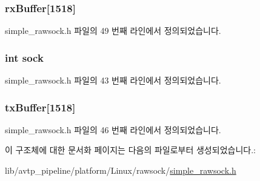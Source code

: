 \subsubsection[{\texorpdfstring{rx\+Buffer}{rxBuffer}}]{ rx\+Buffer\mbox{[}1518\mbox{]}}\hypertarget{structsimple__rawsock__t_a60a36f98faf9efc0f3447c6014c822ce}{}\label{structsimple__rawsock__t_a60a36f98faf9efc0f3447c6014c822ce}


simple\+\_\+rawsock.\+h 파일의 49 번째 라인에서 정의되었습니다.

\subsubsection[{\texorpdfstring{sock}{sock}}]{\setlength{\rightskip}{0pt plus 5cm}int sock}\hypertarget{structsimple__rawsock__t_a5903d0b282fc5eae503de618f896b5e1}{}\label{structsimple__rawsock__t_a5903d0b282fc5eae503de618f896b5e1}


simple\+\_\+rawsock.\+h 파일의 43 번째 라인에서 정의되었습니다.

\subsubsection[{\texorpdfstring{tx\+Buffer}{txBuffer}}]{ tx\+Buffer\mbox{[}1518\mbox{]}}\hypertarget{structsimple__rawsock__t_a7661fa3516bae1bdfe2000e2dea164ae}{}\label{structsimple__rawsock__t_a7661fa3516bae1bdfe2000e2dea164ae}


simple\+\_\+rawsock.\+h 파일의 46 번째 라인에서 정의되었습니다.



이 구조체에 대한 문서화 페이지는 다음의 파일로부터 생성되었습니다.\+:\begin{DoxyCompactItemize}
\item 
lib/avtp\+\_\+pipeline/platform/\+Linux/rawsock/\hyperlink{simple__rawsock_8h}{simple\+\_\+rawsock.\+h}\end{DoxyCompactItemize}
